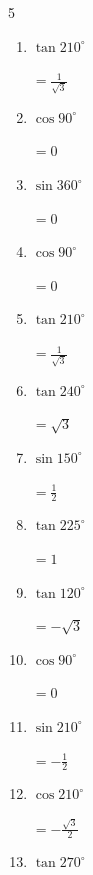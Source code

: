 \begin{multicols}{5}
\begin{enumerate}
        $\displaystyle =-\frac{1}{\sqrt{2}}$

  \item $\displaystyle \tan{210^\circ}$

        $\displaystyle =\frac{1}{\sqrt{3}}$

  \item $\displaystyle \cos{90^\circ}$

        $\displaystyle =0$

  \item $\displaystyle \sin{360^\circ}$

        $\displaystyle =0$

  \item $\displaystyle \cos{90^\circ}$

        $\displaystyle =0$

  \item $\displaystyle \tan{210^\circ}$

        $\displaystyle =\frac{1}{\sqrt{3}}$

  \item $\displaystyle \tan{240^\circ}$

        $\displaystyle =\sqrt{3}$

  \item $\displaystyle \sin{150^\circ}$

        $\displaystyle =\frac{1}{2}$

  \item $\displaystyle \tan{225^\circ}$

        $\displaystyle =1$

\columnbreak %

  \item $\displaystyle \tan{120^\circ}$

        $\displaystyle =-\sqrt{3}$

  \item $\displaystyle \cos{90^\circ}$

        $\displaystyle =0$

  \item $\displaystyle \sin{210^\circ}$

        $\displaystyle =-\frac{1}{2}$

  \item $\displaystyle \cos{210^\circ}$

        $\displaystyle =-\frac{\sqrt{3}}{2}$

  \item $\displaystyle \tan{270^\circ}$


\end{enumerate}
\end{multicols}
